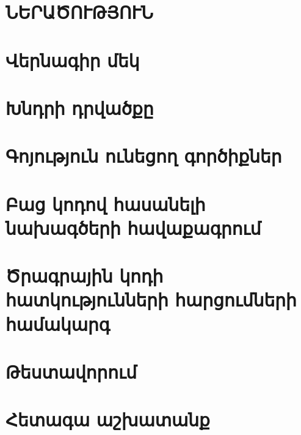 \documentclass[a4paper, 12pt]{report}
\begin{document}
    

    \setcounter{page}{2}
    \setcounter{tocdepth}{3}
    \setcounter{secnumdepth}{3}

    

    

    \newpage
    \begin{center}
        \tableofcontents
    \end{center}

    \clearpage

    \section*{\textbf{ՆԵՐԱԾՈՒԹՅՈՒՆ}}
    


    \section{Վերնագիր մեկ}
    

	\section{Խնդրի դրվածքը}
	
		
	\section{Գոյություն ունեցող գործիքներ}
	
			
	\section{Բաց կոդով հասանելի նախագծերի հավաքագրում}
	
	
	\section{Ծրագրային կոդի հատկությունների հարցումների համակարգ}
	
		
	\section{Թեստավորում}
	
			
	\section{Հետագա աշխատանք}
	
	
\end{document}
